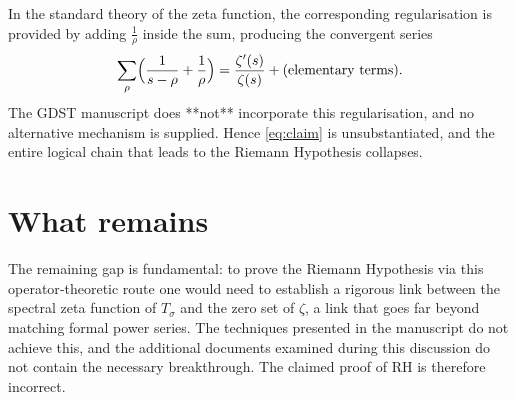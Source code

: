 \documentclass[11pt,a4paper]{article}
\theoremstyle{definition}
\begin{document}
In the standard theory of the zeta function, the corresponding regularisation is provided by adding \(\frac1\rho\) inside the sum, producing the convergent series
\[
\sum_{\rho}\Bigl(\frac1{s-\rho}+\frac1\rho\Bigr)
= \frac{\zeta'(s)}{\zeta(s)} + (\text{elementary terms}).
\]
The GDST manuscript does **not** incorporate this regularisation, and no alternative mechanism is supplied.  Hence \eqref{eq:claim} is unsubstantiated, and the entire logical chain that leads to the Riemann Hypothesis collapses.

\section{What remains}
The remaining gap is fundamental: to prove the Riemann Hypothesis via this operator‑theoretic route one would need to establish a rigorous link between the spectral zeta function of \(T_\sigma\) and the zero set of \(\zeta\), a link that goes far beyond matching formal power series.  The techniques presented in the manuscript do not achieve this, and the additional documents examined during this discussion do not contain the necessary breakthrough.  The claimed proof of RH is therefore incorrect.
\end{document}
